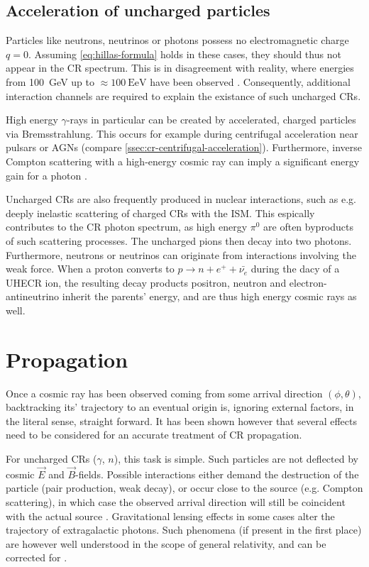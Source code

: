\subsection{Acceleration of uncharged particles}
\label{ssec:cr-uncharged-acceleration}

Particles like neutrons, neutrinos or photons possess no electromagnetic charge $q = 0$. Assuming \autoref{eq:hillas-formula} holds in these cases, they 
should thus not appear in the CR spectrum. This is in disagreement with reality, where energies from \SI{100}{\giga\electronvolt} up to 
$\approx\SI{100}{\exa\electronvolt}$ have been observed \cite{abeysekara2018very, ishihara2016extremely}. Consequently, additional interaction channels are 
required to explain the existance of such uncharged CRs.

High energy $\gamma$-rays in particular can be created by accelerated, charged particles via Bremsstrahlung. This occurs for example during centrifugal 
acceleration near pulsars or AGNs (compare \autoref{ssec:cr-centrifugal-acceleration}). Furthermore, inverse Compton scattering with a high-energy cosmic ray can 
imply a significant energy gain for a photon \cite{jones1965inverse}.

Uncharged CRs are also frequently produced in nuclear interactions, such as e.g. deeply inelastic scattering of charged CRs with the ISM. This espically 
contributes to the CR photon spectrum, as high energy $\pi^0$ are often byproducts of such scattering processes. The uncharged pions then decay into two photons. 
Furthermore, neutrons or neutrinos can originate from interactions involving the weak force. When a proton converts to $p\rightarrow n+e^++\bar{\nu_e}$ during the 
dacy of a UHECR ion, the resulting decay products positron, neutron and electron-antineutrino inherit the parents' energy, and are thus high energy cosmic rays as 
well.

\section{Propagation}
\label{sec:cr-propagation}

Once a cosmic ray has been observed coming from some arrival direction $(\phi, \theta)$, backtracking its' trajectory to an eventual origin is, ignoring external 
factors, in the literal sense, straight forward. It has been shown however that several effects need to be considered for an accurate treatment of CR propagation. 

For uncharged CRs ($\gamma$, $n$), this task is simple. Such particles are not deflected by cosmic $\vec{E}$ and $\vec{B}$-fields. Possible interactions either 
demand the destruction of the particle (pair production, weak decay), or occur close to the source (e.g. Compton scattering), in which case the observed arrival 
direction will still be coincident with the actual source \cite{fermi201398}. Gravitational lensing effects in some cases alter the trajectory of extragalactic 
photons. Such phenomena (if present in the first place) are however well understood in the scope of general relativity, and can be corrected for 
\cite{bartelmann2010gravitational, bartelmann2001weak}.

